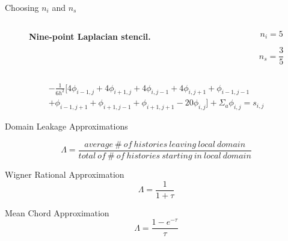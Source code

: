\documentclass{beamer}
\begin{document}
\begin{frame}{Choosing $n_i$ and $n_s$}

  \begin{columns}

    \begin{column}{0.5\textwidth}
      \begin{figure}[t!]
        \begin{center}
          \scalebox{0.5}{}
        \end{center}
        \caption{\textbf{Nine-point Laplacian stencil.}}
      \end{figure}
    \end{column}

    \begin{column}{0.5\textwidth}
      \[
      n_i = 5
      \]

      \[
      n_s = \frac{3}{5}
      \]
    \end{column}

  \end{columns}

  \begin{multline}
    -\frac{1}{6h^2}[4 \phi_{i-1,j} + 4 \phi_{i+1,j} + 4 \phi_{i,j-1} + 4
      \phi_{i,j+1} + \phi_{i-1,j-1}\\ + \phi_{i-1,j+1} + \phi_{i+1,j-1}
      + \phi_{i+1,j+1} - 20 \phi_{i,j}] + \Sigma_a \phi_{i,j} = s_{i,j}
  \end{multline}

\end{frame}

\begin{frame}{Domain Leakage Approximations}

  \[
    \Lambda = \frac{average\ \#\ of\ histories\ leaving\ local\ domain}
            {total\ of\ \#\ of\ histories\ starting\ in\ local\ domain}
  \]
  \bigskip

  \begin{beamerboxesrounded}[upper=boxheadcolor,lower=boxbodycolor,shadow=true]
    {Wigner Rational Approximation}
  \[
    \Lambda = \frac{1}{1+\tau}
  \]
  \end{beamerboxesrounded}
  \bigskip

  \begin{beamerboxesrounded}[upper=boxheadcolor,lower=boxbodycolor,shadow=true]
    {Mean Chord Approximation}
  \[
    \Lambda = \frac{1-e^{-\tau}}{\tau}
  \]
  \end{beamerboxesrounded}

\end{frame}
\end{document}

